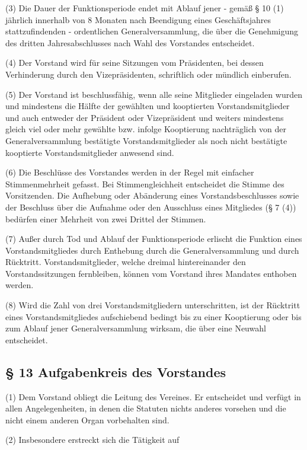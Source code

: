 \documentclass[10pt,a4paper]{article}
\begin{document}
(3)
Die Dauer der Funktionsperiode endet mit Ablauf jener - gemäß § 10 (1) jährlich innerhalb von 8 Monaten nach Beendigung eines Geschäftsjahres stattzufindenden - ordentlichen Generalversammlung, die über die Genehmigung des dritten Jahresabschlusses nach Wahl des Vorstandes entscheidet.

(4)
Der Vorstand wird für seine Sitzungen vom Präsidenten, bei dessen Verhinderung durch den Vizepräsidenten, schriftlich oder mündlich einberufen.

(5)
Der Vorstand ist beschlussfähig, wenn alle seine Mitglieder eingeladen wurden und mindestens die Hälfte der gewählten und kooptierten Vorstandsmitglieder und auch entweder der Präsident oder Vizepräsident und weiters mindestens gleich viel oder mehr gewählte bzw. infolge Kooptierung nachträglich von der Generalversammlung bestätigte Vorstandsmitglieder als noch nicht bestätigte kooptierte Vorstandsmitglieder anwesend sind.

(6)
Die Beschlüsse des Vorstandes werden in der Regel mit einfacher Stimmenmehrheit gefasst.
Bei Stimmengleichheit entscheidet die Stimme des Vorsitzenden.
Die Aufhebung oder Abänderung eines Vorstandsbeschlusses sowie der Beschluss über die Aufnahme oder den Ausschluss eines Mitgliedes (§ 7 (4)) bedürfen einer Mehrheit von zwei Drittel der Stimmen.

(7)
Außer durch Tod und Ablauf der Funktionsperiode erlischt die Funktion eines Vorstandsmitgliedes durch Enthebung durch die Generalversammlung und durch Rücktritt.
Vorstandsmitglieder, welche dreimal hintereinander den Vorstandssitzungen fernbleiben, können vom Vorstand ihres Mandates enthoben werden.

(8)
Wird die Zahl von drei Vorstandsmitgliedern unterschritten, ist der Rücktritt eines Vorstandsmitgliedes aufschiebend bedingt bis zu einer Kooptierung oder bis zum Ablauf jener Generalversammlung wirksam, die über eine Neuwahl entscheidet.

\subsection{§ 13
Aufgabenkreis des Vorstandes}

(1)
Dem Vorstand obliegt die Leitung des Vereines.
Er entscheidet und verfügt in allen Angelegenheiten, in denen die Statuten nichts anderes vorsehen und die nicht einem anderen Organ vorbehalten sind.

(2)
Insbesondere erstreckt sich die Tätigkeit auf
\end{document}
